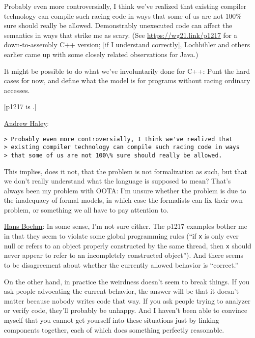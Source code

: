 Probably even more controversially, I think we've realized that existing
compiler technology can compile such racing code in ways that some of us are
not 100\% sure should really be allowed. Demonstrably unexecuted code can
affect the semantics in ways that strike me as scary. (See
\url{https://wg21.link/p1217} for a down-to-assembly C++ version; [if I
understand correctly], Lochbihler and others earlier came up with some
closely related observations for Java.)

It might be possible to do what we've involuntarily done for C++: Punt the
hard cases for now, and define what the model is for programs without
racing ordinary accesses.

[p1217 is \cite{BoehmOOTA}.]

\bigskip

\href{https://mail.openjdk.java.net/pipermail/jmm-dev/2021-August/000447.html}{Andrew Haley}:
\begin{verbatim}
> Probably even more controversially, I think we've realized that
> existing compiler technology can compile such racing code in ways
> that some of us are not 100\% sure should really be allowed.
\end{verbatim}
This implies, does it not, that the problem is not formalization as
such, but that we don't really understand what the language is
supposed to mean? That's always been my problem with OOTA: I'm unsure
whether the problem is due to the inadequacy of formal models, in
which case the formalists can fix their own problem, or something we
all have to pay attention to.

\smallskip

\href{https://mail.openjdk.java.net/pipermail/jmm-dev/2021-August/000450.html}{Hans Boehm}:
In some sense, I'm not sure either. The p1217 examples bother me in that
they seem to violate  some global programming rules (``if \texttt{x} is only ever null
or refers to an object properly constructed by the same thread, then \texttt{x}
should never appear to refer to an incompletely constructed object'').
And there seems to be disagreement about whether the currently allowed
behavior is ``correct.''

On the other hand, in practice the weirdness doesn't seem to break things.
If you ask people advocating the current behavior, the answer will be
that it doesn't matter because nobody writes code that way. If you ask
people trying to analyzer or verify code, they'll probably be unhappy.
And I haven't been able to convince myself that you cannot get yourself
into these situations just by linking components together, each of which
does something perfectly reasonable.

